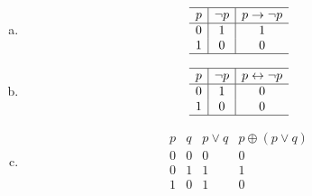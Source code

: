 {{        %
        \begin{practices}
            \begin{enumerate}[a)]
                \item 
                {
                    \begin{table}[H]
                        \[
                            \begin{array}{c|c|c}
                                \hline
                                p & \neg p & p \rightarrow \neg p \\
                                \hline
                                0 & 1 & 1 \\
                                1 & 0 & 0 \\
                                \hline
                            \end{array}
                        \]
                    \end{table}
                }
                \item 
                {
                    \begin{table}[H]
                        \[
                            \begin{array}{c|c|c}
                                \hline
                                p & \neg p & p \leftrightarrow \neg p \\
                                \hline
                                0 & 1 & 0 \\
                                1 & 0 & 0 \\
                                \hline
                            \end{array}
                        \]
                    \end{table}
                }
                \item 
                {
                    \begin{table}[H]
                        \[
                            \begin{array}{c|c|c|c}
                                \hline
                                p & q & p \vee q & p \oplus (p \vee q) \\
                                \hline
                                0 & 0 & 0 & 0 \\
                                0 & 1 & 1 & 1 \\
                                1 & 0 & 1 & 0 \\

\end{array}\]
\end{table}}
\end{enumerate}
\end{practices}}}
